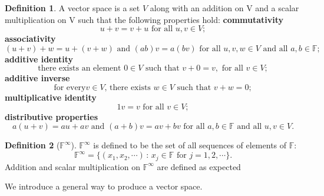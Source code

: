 \documentclass[paper=a4, fontsize=11pt]{scrartcl}
\numberwithin{equation}{section}		%
\numberwithin{figure}{section}			%
\numberwithin{table}{section}				%
\theoremstyle{definition}
\newtheorem{definition}{Definition}[section]
\theoremstyle{remark}
\theoremstyle{example}
\begin{document}
\begin{definition}
    A vector space is a set $V$ along with an addition on V and a scalar multiplication on V such that the following properties hold:
    \newline
    \textbf{commutativity}
    \begin{equation}
        u + v = v + u \text{ for all } u, v \in V;
    \end{equation}
    \textbf{associativity}
    \begin{equation}
        (u + v) + w = u + (v + w) \text{ and } (ab)v = a(bv) \text{ for all } u, v, w \in V \text{ and all } a, b \in \mathbb{F};
    \end{equation}
    \textbf{additive identity}
    \begin{equation}
        \text{there exists an element } 0 \in V \text{ such that } v + 0 = v, \text{ for all } v \in V;
    \end{equation}
    \textbf{additive inverse}
    \begin{equation}
        \text{for every} v \in V\text{, there exists }w \in V \text{ such that }v + w = 0;
    \end{equation}
    \textbf{multiplicative identity}
    \begin{equation}
        1v = v \text{ for all } v \in V;
    \end{equation}
    \textbf{distributive properties}
    \begin{equation}
        a(u + v) = au + av \text{ and } (a+b)v = av + bv \text{ for all } a,b \in \mathbb{F} \text{ and all } u,v \in V.
    \end{equation}
\end{definition}

\begin{definition}[$\mathbb{F}^{\infty}$]
    $\mathbb{F}^{\infty}$ is defined to be the set of all sequences of elements of $\mathbb{F}$:
    \begin{equation}
        \mathbb{F}^{\infty} = \{(x_1,x_2,\cdots)\,:\,x_j\in\mathbb{F} \text{ for } j = 1,2,\cdots\}.
    \end{equation}
    Addition and scalar multiplication on $\mathbb{F}^{\infty}$ are defined as expected
\end{definition}

We introduce a general way to produce a vector space.
\end{document}
